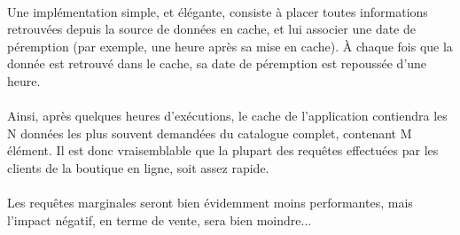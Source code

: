 {  \paragraph{} Une implémentation simple, et élégante, consiste à placer toutes informations
  retrouvées depuis la source de données en cache, et lui associer une date de péremption (par
  exemple, une heure après sa mise en cache). À chaque fois que la donnée est retrouvé dans le
  cache, sa date de péremption est repoussée d'une heure.

  \paragraph{} Ainsi, après quelques heures d'exécutions, le cache de l'application contiendra les
  N données les plus souvent demandées du catalogue complet, contenant M élément. Il est donc
  vraisemblable que la plupart des requêtes effectuées par les clients de la boutique en ligne, soit
  assez rapide.

  \paragraph{} Les requêtes marginales seront bien évidemment moins performantes, mais l'impact
  négatif, en terme de vente, sera bien moindre...
}
